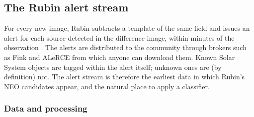 \documentclass[linenumbers,twocolumn]{aastex701}
\newcommand{\priora}{{\tt priora}\xspace} %
\begin{document}


\subsection{The Rubin alert stream}
\label{sec:alerts}

For every new image, Rubin subtracts a template of the same field and
issues an alert for each source detected in the difference image, within
minutes of the observation \citep{LDM-612}. The alerts are distributed to
the community through brokers such as Fink \citep{moller2021} and ALeRCE
\citep{forster2021} from which anyone can download them. Known Solar System objects are tagged within the alert itself; unknown ones are (by
definition) not. The alert stream is
therefore the earliest data in which Rubin's NEO candidates appear, and the
natural place to apply a classifier.


\subsubsection{Data and processing}
\label{sec:lsstdata}
\label{sec:lsstlink}
\label{sec:lsstlabels}
\end{document}
